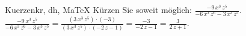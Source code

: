 \begin{MAufgabe}{Kuerzen}{kr, dh, MaTeX}
K\"urzen Sie soweit m\"oglich: $\frac{- 9\, x^3\, z^5}{ - 6\, x^3\, z^6 - 3\, x^3\, z^5}$.\\ 
\ifLsg\MLoesung
\quad $\frac{- 9\, x^3\, z^5}{ - 6\, x^3\, z^6 - 3\, x^3\, z^5}=\frac{(3\, x^3\, z^5)\cdot(-3)}{(3\, x^3\, z^5)\cdot( - 2\, z - 1)}=\frac{-3}{ - 2\, z - 1}=\frac{3}{2\, z + 1}$.\else\relax\fi
 \end{MAufgabe}